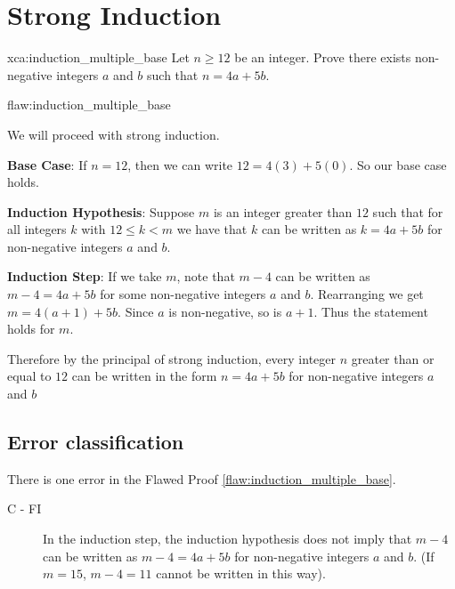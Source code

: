 \section{Strong Induction}

\begin{xca}{xca:induction_multiple_base}
Let $n \geq 12$ be an integer. Prove there exists non-negative integers $a$ and $b$ such that $n = 4a + 5b$. 
\end{xca}

\begin{flaw}{flaw:induction_multiple_base} 

We will proceed with strong induction. 

\noindent \textbf{Base Case}: If $n = 12$, then we can write $12 = 4(3) + 5(0)$. So our base case holds.  

\noindent  \textbf{Induction Hypothesis}: Suppose $m$ is an integer greater than $12$ such that for all integers $k$ with $12 \leq k < m$ we have that $k$ can be written as $k = 4a + 5b$ for non-negative integers $a$ and $b$. 


\noindent \textbf{Induction Step}: If we take $m$, note that $m-4$ can be written as $m-4 = 4a + 5b$ for some non-negative integers $a$ and $b$. Rearranging we get $m = 4(a+1) + 5b$. Since $a$ is non-negative, so is $a+1$. Thus the statement holds for $m$. 

Therefore by the principal of strong induction, every integer $n$ greater than or equal to $12$ can be written in the form $n = 4a + 5b$ for non-negative integers $a$ and $b$
\end{flaw}

\clearpage
\subsection{Error classification}

There is one error
 in the Flawed Proof \ref{flaw:induction_multiple_base}. 
 
 \begin{description}
    \item[C - FI] In the induction step, the induction hypothesis does not imply that $m-4$ can be written as $m-4 = 4a + 5b$ for non-negative integers $a$ and $b$. (If $m=15$, $m-4 = 11$ cannot be written in this way). 
 \end{description}

